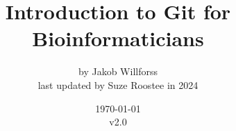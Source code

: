 \documentclass[12pt]{report}
\begin{document}
\title{Introduction to Git for Bioinformaticians}
\author{
	by Jakob Willforss\\
	last updated by Suze Roostee in 2024\\
}
\date{\today\\v2.0}
\maketitle

\renewcommand{\bibname}{References}

\setcounter{tocdepth}{2}
\tableofcontents












\end{document}
